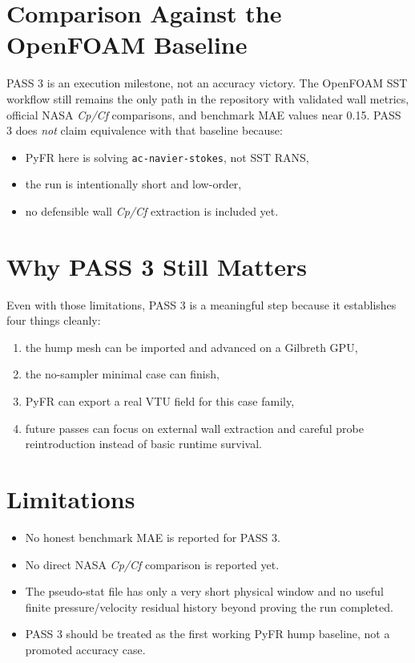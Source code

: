 \documentclass[11pt]{article}
\begin{document}
\section{Comparison Against the OpenFOAM Baseline}
PASS 3 is an execution milestone, not an accuracy victory. The OpenFOAM SST workflow still remains the only path in the repository with validated wall metrics, official NASA \textit{Cp/Cf} comparisons, and benchmark MAE values near \num{0.15}. PASS 3 does \emph{not} claim equivalence with that baseline because:
\begin{itemize}
  \item PyFR here is solving \texttt{ac-navier-stokes}, not SST RANS,
  \item the run is intentionally short and low-order,
  \item no defensible wall \textit{Cp/Cf} extraction is included yet.
\end{itemize}

\section{Why PASS 3 Still Matters}
Even with those limitations, PASS 3 is a meaningful step because it establishes four things cleanly:
\begin{enumerate}
  \item the hump mesh can be imported and advanced on a Gilbreth GPU,
  \item the no-sampler minimal case can finish,
  \item PyFR can export a real VTU field for this case family,
  \item future passes can focus on external wall extraction and careful probe reintroduction instead of basic runtime survival.
\end{enumerate}

\section{Limitations}
\begin{itemize}
  \item No honest benchmark MAE is reported for PASS 3.
  \item No direct NASA \textit{Cp/Cf} comparison is reported yet.
  \item The pseudo-stat file has only a very short physical window and no useful finite pressure/velocity residual history beyond proving the run completed.
  \item PASS 3 should be treated as the first working PyFR hump baseline, not a promoted accuracy case.
\end{itemize}
\end{document}
